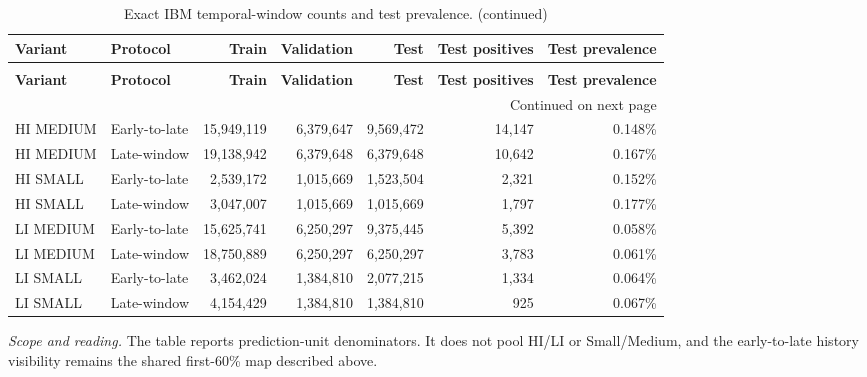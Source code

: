 \begingroup
\footnotesize
\setlength{\tabcolsep}{3pt}
\renewcommand{\arraystretch}{1.10}
\begin{longtable}{@{}p{} p{} r r r r r@{}}
\caption{Exact IBM temporal-window counts and test prevalence.}\label{tab:s-ibm-windows}\\
\toprule
\textbf{Variant} & \textbf{Protocol} & \textbf{Train} & \textbf{Validation} & \textbf{Test} & \textbf{Test positives} & \textbf{Test prevalence} \\
\midrule
\endfirsthead
\caption[]{Exact IBM temporal-window counts and test prevalence. (continued)}\\
\toprule
\textbf{Variant} & \textbf{Protocol} & \textbf{Train} & \textbf{Validation} & \textbf{Test} & \textbf{Test positives} & \textbf{Test prevalence} \\
\midrule
\endhead
\midrule
\multicolumn{7}{r}{\footnotesize Continued on next page}\\
\endfoot
\bottomrule
\endlastfoot
HI MEDIUM & Early-to-late & 15,949,119 & 6,379,647 & 9,569,472 & 14,147 & 0.148\% \\
HI MEDIUM & Late-window & 19,138,942 & 6,379,648 & 6,379,648 & 10,642 & 0.167\% \\
HI SMALL & Early-to-late & 2,539,172 & 1,015,669 & 1,523,504 & 2,321 & 0.152\% \\
HI SMALL & Late-window & 3,047,007 & 1,015,669 & 1,015,669 & 1,797 & 0.177\% \\
LI MEDIUM & Early-to-late & 15,625,741 & 6,250,297 & 9,375,445 & 5,392 & 0.058\% \\
LI MEDIUM & Late-window & 18,750,889 & 6,250,297 & 6,250,297 & 3,783 & 0.061\% \\
LI SMALL & Early-to-late & 3,462,024 & 1,384,810 & 2,077,215 & 1,334 & 0.064\% \\
LI SMALL & Late-window & 4,154,429 & 1,384,810 & 1,384,810 & 925 & 0.067\% \\
\end{longtable}
\noindent\footnotesize\emph{Scope and reading.} The table reports prediction-unit denominators. It does not pool HI/LI or Small/Medium, and the early-to-late history visibility remains the shared first-60\% map described above.\par
\endgroup
